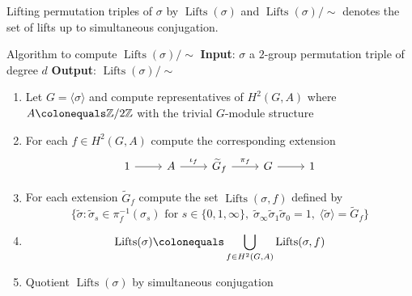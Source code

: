 \documentclass[handout,xcolor=dvipsnames]{beamer}
\theoremstyle{plain}
\newcommand{\ZZ}{\mathbb Z}
\newcommand{\wt}[1]{\widetilde{#1}}
\DeclareMathOperator{\Lifts}{Lifts}
\begin{document}
{\begin{frame}[fragile]{Lifting permutation triples}
      of $\sigma$ by $\Lifts(\sigma)$
      and $\Lifts(\sigma)/\!\!\sim$
      denotes the set of lifts up
      to simultaneous conjugation.
    \end{frame}
    \begin{frame}[fragile]{Algorithm to compute $\Lifts(\sigma)/\!\!\sim$}
      \textbf{Input}:
      $\sigma$ a $2$-group permutation triple of degree $d$
      \newline
      \textbf{Output}:
      $\Lifts(\sigma)/\!\!\sim$
      \pause\par
      \begin{enumerate}
        \item
          Let $G = \langle\sigma\rangle$
          and compute representatives
          of $H^2(G,A)$
          where $A\colonequals\ZZ/2\ZZ$
          with the trivial $G$-module structure
        \item\pause
          For each $f\in H^2(G,A)$
          compute the corresponding
          extension
          \[
            \begin{tikzcd}
              1\arrow{r}&A\arrow{r}{\iota_f}
                        &\wt{G}_f\arrow{r}{\pi_f}
                        &G\arrow{r}&1
            \end{tikzcd}
          \]
        \item\pause
          For each extension
          $\wt{G}_f$
          compute the set
          $\Lifts(\sigma,f)$ defined by
          \[
            \Big\{
              \wt{\sigma}
              :
              \wt{\sigma}_s\in\pi_f^{-1}
              (\sigma_s)\text{ for }
              s\in\{0,1,\infty\},\;
              \wt{\sigma}_\infty
              \wt{\sigma}_1
              \wt{\sigma}_0=1,\;
              \langle\wt{\sigma}\rangle
              =\wt{G}_f
            \Big\}
          \]
        \item\pause
          \[
            \Lifts(\sigma)
            \colonequals
            \bigcup_{f\in H^2(G,A)}
            \Lifts(\sigma, f)
          \]
        \item\pause
          Quotient $\Lifts(\sigma)$
          by simultaneous conjugation

\end{enumerate}
\end{frame}}
\end{document}
